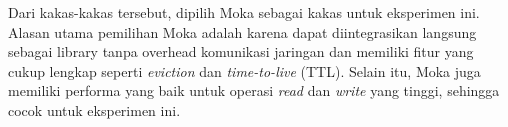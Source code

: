 Dari kakas-kakas tersebut, dipilih Moka sebagai kakas untuk eksperimen ini. Alasan utama pemilihan Moka adalah karena dapat diintegrasikan langsung sebagai library tanpa overhead komunikasi jaringan dan memiliki fitur yang cukup lengkap seperti \textit{eviction} dan \textit{time-to-live} (TTL). Selain itu, Moka juga memiliki performa yang baik untuk operasi \textit{read} dan \textit{write} yang tinggi, sehingga cocok untuk eksperimen ini.
